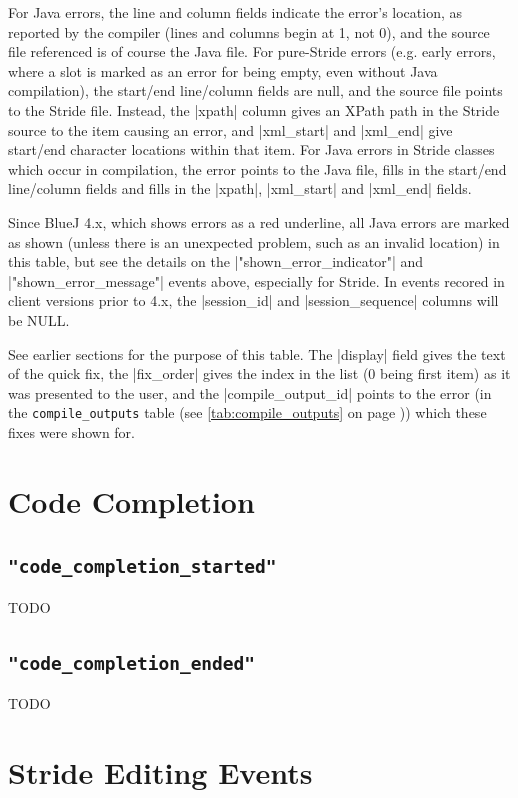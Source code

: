 \documentclass{report}
\newcommand{\myref}[1]{\autoref{#1} on page \pageref*{#1}}
\newcommand{\tabref}[1]{\lstinline|#1| table (see \myref{tab:#1})}
\begin{document}
For Java errors, the line and column fields indicate the error's location, as reported by the
compiler  (lines and columns begin at 1, not 0), and the source file referenced is of
course the Java file.  For pure-Stride errors (e.g. early errors, where a slot is marked as
an error for being empty, even without Java compilation), the start/end line/column fields
are null, and the source file points to the Stride file.  Instead, the |xpath| column
gives an XPath path in the Stride source to the item causing an error, and |xml_start| and |xml_end|
give start/end character locations within that item.  For Java errors in Stride classes which
occur in compilation, the error points to the Java file, fills in the start/end line/column fields
and fills in the |xpath|, |xml_start| and |xml_end| fields.

Since BlueJ 4.x, which shows errors as a red underline, all Java errors are marked
as shown (unless there is an unexpected problem, such as an invalid location) in
this table, but see the details on the |"shown_error_indicator"| and
|"shown_error_message"| events above, especially for Stride.  In events recored in client versions prior to 4.x,
the |session_id| and |session_sequence| columns will be NULL.


See earlier sections for the purpose of this table.  The |display| field gives the text of the
quick fix, the |fix_order| gives the index in the list (0 being first item) as it was presented
to the user, and the |compile_output_id| points to the error (in the \tabref{compile_outputs})
which these fixes were shown for.

\section{Code Completion}

\subsection{\lstinline!"code_completion_started"!} TODO
\subsection{\lstinline!"code_completion_ended"!} TODO

\section{Stride Editing Events}
\end{document}
